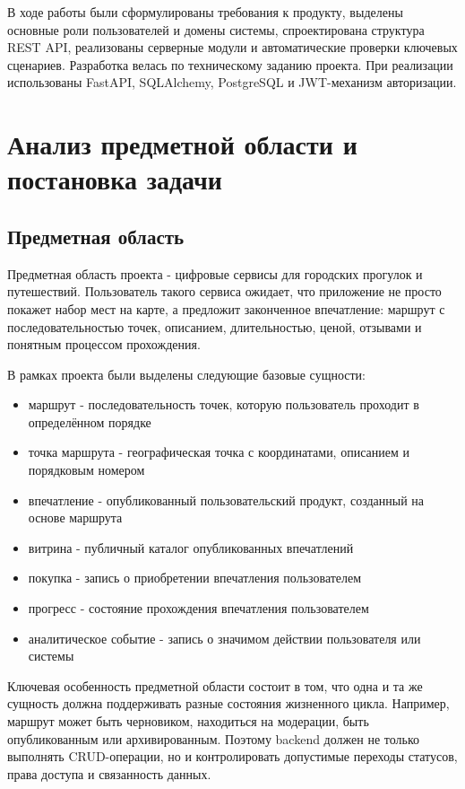 \documentclass[a4paper,12pt]{extarticle}
\begin{document}
В ходе работы были сформулированы требования к продукту, выделены основные роли пользователей и домены системы, спроектирована структура REST API, реализованы серверные модули и автоматические проверки ключевых сценариев. Разработка велась по техническому заданию проекта. При реализации использованы FastAPI, SQLAlchemy, PostgreSQL и JWT-механизм авторизации.

\section{Анализ предметной области и постановка задачи}

\subsection{Предметная область}

Предметная область проекта - цифровые сервисы для городских прогулок и путешествий. Пользователь такого сервиса ожидает, что приложение не просто покажет набор мест на карте, а предложит законченное впечатление: маршрут с последовательностью точек, описанием, длительностью, ценой, отзывами и понятным процессом прохождения.

В рамках проекта были выделены следующие базовые сущности:
\begin{itemize}
	\item маршрут - последовательность точек, которую пользователь проходит в определённом порядке
	\item точка маршрута - географическая точка с координатами, описанием и порядковым номером
	\item впечатление - опубликованный пользовательский продукт, созданный на основе маршрута
	\item витрина - публичный каталог опубликованных впечатлений
	\item покупка - запись о приобретении впечатления пользователем
	\item прогресс - состояние прохождения впечатления пользователем
	\item аналитическое событие - запись о значимом действии пользователя или системы
\end{itemize}

Ключевая особенность предметной области состоит в том, что одна и та же сущность должна поддерживать разные состояния жизненного цикла. Например, маршрут может быть черновиком, находиться на модерации, быть опубликованным или архивированным. Поэтому backend должен не только выполнять CRUD-операции, но и контролировать допустимые переходы статусов, права доступа и связанность данных.
\end{document}
